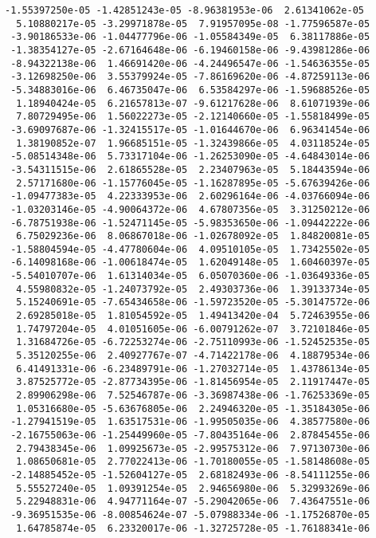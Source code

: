 \documentclass[11pt]{article}
\begin{document}
\begin{Verbatim}[commandchars=\\\{\}]
 -1.55397250e-05 -1.42851243e-05 -8.96381953e-06  2.61341062e-05
  5.10880217e-05 -3.29971878e-05  7.91957095e-08 -1.77596587e-05
 -3.90186533e-06 -1.04477796e-06 -1.05584349e-05  6.38117886e-05
 -1.38354127e-05 -2.67164648e-06 -6.19460158e-06 -9.43981286e-06
 -8.94322138e-06  1.46691420e-06 -4.24496547e-06 -1.54636355e-05
 -3.12698250e-06  3.55379924e-05 -7.86169620e-06 -4.87259113e-06
 -5.34883016e-06  6.46735047e-06  6.53584297e-06 -1.59688526e-05
  1.18940424e-05  6.21657813e-07 -9.61217628e-06  8.61071939e-06
  7.80729495e-06  1.56022273e-05 -2.12140660e-05 -1.55818499e-05
 -3.69097687e-06 -1.32415517e-05 -1.01644670e-06  6.96341454e-06
  1.38190852e-07  1.96685151e-05 -1.32439866e-05  4.03118524e-05
 -5.08514348e-06  5.73317104e-06 -1.26253090e-05 -4.64843014e-06
 -3.54311515e-06  2.61865528e-05  2.23407963e-05  5.18443594e-06
  2.57171680e-06 -1.15776045e-05 -1.16287895e-05 -5.67639426e-06
 -1.09477383e-05  4.22333953e-06  2.60296164e-06 -4.03766094e-06
 -1.03203146e-05 -4.90064372e-06  4.67807356e-05  3.31250212e-06
 -6.78751938e-06 -1.52471145e-05 -5.98353650e-06 -1.09442222e-06
  6.75029236e-06  8.06867018e-06 -1.02678092e-05  1.84820081e-05
 -1.58804594e-05 -4.47780604e-06  4.09510105e-05  1.73425502e-05
 -6.14098168e-06 -1.00618474e-05  1.62049148e-05  1.60460397e-05
 -5.54010707e-06  1.61314034e-05  6.05070360e-06 -1.03649336e-05
  4.55980832e-05 -1.24073792e-05  2.49303736e-06  1.39133734e-05
  5.15240691e-05 -7.65434658e-06 -1.59723520e-05 -5.30147572e-06
  2.69285018e-05  1.81054592e-05  1.49413420e-04  5.72463955e-06
  1.74797204e-05  4.01051605e-06 -6.00791262e-07  3.72101846e-05
  1.31684726e-05 -6.72253274e-06 -2.75110993e-06 -1.52452535e-05
  5.35120255e-06  2.40927767e-07 -4.71422178e-06  4.18879534e-06
  6.41491331e-06 -6.23489791e-06 -1.27032714e-05  1.43786134e-05
  3.87525772e-05 -2.87734395e-06 -1.81456954e-05  2.11917447e-05
  2.89906298e-06  7.52546787e-06 -3.36987438e-06 -1.76253369e-05
  1.05316680e-05 -5.63676805e-06  2.24946320e-05 -1.35184305e-06
 -1.27941519e-05  1.63517531e-06 -1.99505035e-06  4.38577580e-06
 -2.16755063e-06 -1.25449960e-05 -7.80435164e-06  2.87845455e-06
  2.79438345e-06  1.09925673e-05 -2.99575312e-06  7.97130730e-06
  1.08650681e-05  2.77022413e-06 -1.70180055e-05 -1.58148608e-05
 -2.14885452e-05 -1.52604127e-05  2.68182493e-06 -8.54111255e-06
  5.55527240e-05  1.09391254e-05  2.94656980e-06  5.32993269e-06
  5.22948831e-06  4.94771164e-07 -5.29042065e-06  7.43647551e-06
 -9.36951535e-06 -8.00854624e-07 -5.07988334e-06 -1.17526870e-05
  1.64785874e-05  6.23320017e-06 -1.32725728e-05 -1.76188341e-06

\end{Verbatim}
\end{document}
